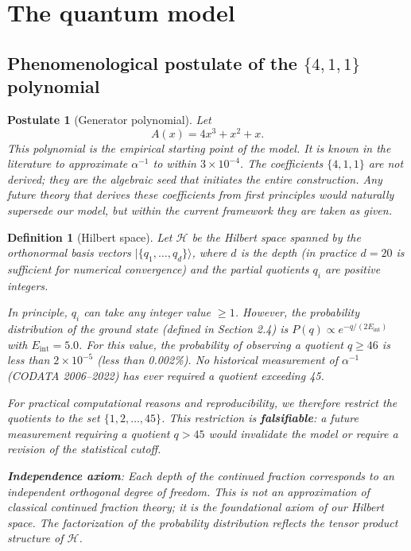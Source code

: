 \documentclass[12pt]{article}
\newtheorem{postulate}{Postulate}
\newtheorem{definition}{Definition}
\begin{document}
\section{The quantum model}

\subsection{Phenomenological postulate of the $\{4,1,1\}$ polynomial}

\begin{postulate}[Generator polynomial]
Let
\[
A(x) = 4x^3 + x^2 + x.
\]
This polynomial is the empirical starting point of the model. It is known in the literature to approximate $\alpha^{-1}$ to within $3\times10^{-4}$. The coefficients $\{4,1,1\}$ are not derived; they are the algebraic seed that initiates the entire construction. Any future theory that derives these coefficients from first principles would naturally supersede our model, but within the current framework they are taken as given.
\end{postulate}

\begin{definition}[Hilbert space]
Let $\mathcal{H}$ be the Hilbert space spanned by the orthonormal basis vectors $|\{q_1,\dots,q_d\}\rangle$, where $d$ is the depth (in practice $d=20$ is sufficient for numerical convergence) and the partial quotients $q_i$ are positive integers.

In principle, $q_i$ can take any integer value $\ge 1$. However, the probability distribution of the ground state (defined in Section 2.4) is $P(q) \propto e^{-q/(2E_{\text{int}})}$ with $E_{\text{int}}=5.0$. For this value, the probability of observing a quotient $q \ge 46$ is less than $2\times10^{-5}$ (less than 0.002\%). No historical measurement of $\alpha^{-1}$ (CODATA 2006–2022) has ever required a quotient exceeding 45.

For practical computational reasons and reproducibility, we therefore restrict the quotients to the set $\{1,2,\dots,45\}$. This restriction is \textbf{falsifiable}: a future measurement requiring a quotient $q>45$ would invalidate the model or require a revision of the statistical cutoff.

\textbf{Independence axiom}: Each depth of the continued fraction corresponds to an independent orthogonal degree of freedom. This is not an approximation of classical continued fraction theory; it is the foundational axiom of our Hilbert space. The factorization of the probability distribution reflects the tensor product structure of $\mathcal{H}$.
\end{definition}
\end{document}
